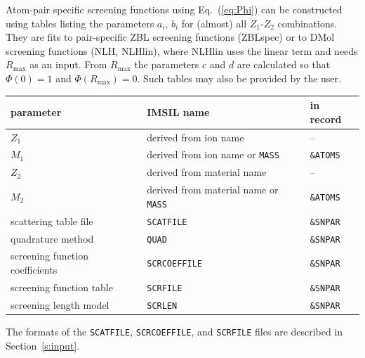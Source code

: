 Atom-pair specific screening functions using Eq.~(\ref{eq:Phi}) can be
constructed using tables listing the parameters $a_i$, $b_i$ for (almost)
all $Z_1$-$Z_2$ combinations. They are fits to pair-specific ZBL screening
functions (ZBLspec) or to DMol screening functions (NLH, NLHlin), where
NLHlin uses the linear term and needs $R_\mathrm{max}$ as an input. From
$R_\mathrm{max}$ the parameters $c$ and $d$ are calculated so that 
$\Phi(0)=1$ and $\Phi(R_\mathrm{max})=0$. Such tables may also be provided
by the user.
%
\begin{center}
\begin{tabular}{lll}
   parameter \quad & IMSIL name \qquad\qquad    & in record \\
   \hline
   $Z_1$           & derived from ion name      & -- \\
   $M_1$           & derived from ion name or 
                     \texttt{MASS}              & \texttt{\&ATOMS} \\
   $Z_2$           & derived from material name & -- \\
   $M_2$           & derived from material name or
                     \texttt{MASS}              & \texttt{\&ATOMS} \\
   scattering 
   table file      & \texttt{SCATFILE}          & \texttt{\&SNPAR} \\
   quadrature 
   method          & \texttt{QUAD}              & \texttt{\&SNPAR} \\
   screening function
   coefficients    & \texttt{SCRCOEFFILE}       & \texttt{\&SNPAR} \\
   screening 
   function table  & \texttt{SCRFILE}           & \texttt{\&SNPAR} \\
   screening
   length model    & \texttt{SCRLEN}            & \texttt{\&SNPAR} \\
\end{tabular}
\end{center}

The formats of the \texttt{SCATFILE}, \texttt{SCRCOEFFILE}, and 
\texttt{SCRFILE} files are described in Section~\ref{s:input}. 

